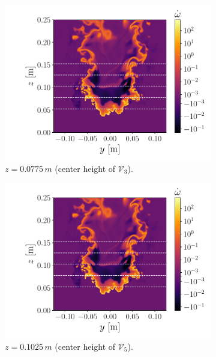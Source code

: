 \documentclass[review]{elsarticle}
\begin{document}
\begin{figure}[!tbp]
\begin{subfigure}[t]{0.48\textwidth}
    \includegraphics[page=3,width=\textwidth, trim = 1.2cm 0cm 0.4cm 0cm, clip=true]{./figs/src_pv.pdf}%
    \caption{$z=0.0775\,\unit{m}$ (center height of $\mathcal{V}_{3}$).}%
 \end{subfigure}\hfill%
  \begin{subfigure}[t]{0.48\textwidth}%
    \includegraphics[page=4,width=\textwidth, trim = 1.2cm 0cm 0.4cm 0cm, clip=true]{./figs/src_pv.pdf}%
    \caption{$z=0.1025\,\unit{m}$ (center height of $\mathcal{V}_{5}$).}%
  \end{subfigure}\\%
  \begin{subfigure}[t]{0.48\textwidth}%

\end{subfigure}
\end{figure}
\end{document}
